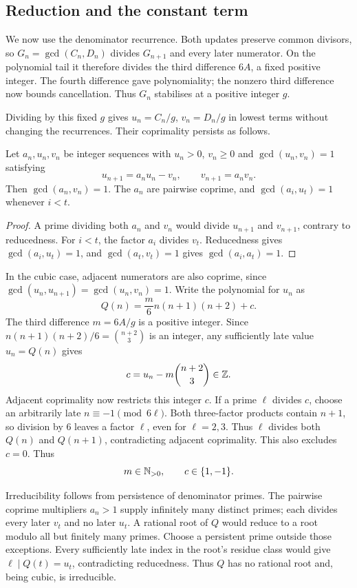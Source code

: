 \documentclass[11pt]{article}
\begin{document}
\subsection{Reduction and the constant term}\label{sec:cubic-normalisation}\label{sec:reduction}
We now use the denominator recurrence. Both updates preserve common
divisors, so $G_n=\gcd(C_n,D_n)$ divides $G_{n+1}$ and every later
numerator. On the polynomial tail it therefore divides the third
difference $6A$, a fixed positive integer. The fourth difference gave
polynomiality; the nonzero third difference now bounds cancellation.
Thus $G_n$ stabilises at a positive integer $g$.

Dividing by this fixed $g$ gives $u_n=C_n/g$, $v_n=D_n/g$ in lowest
terms without changing the recurrences. Their coprimality persists as
follows.

\begin{proposition}\label{res:reduced}
Let $a_n,u_n,v_n$ be integer sequences with $u_n>0$, $v_n\ge0$ and
$\gcd(u_n,v_n)=1$ satisfying
\[
 u_{n+1}=a_nu_n-v_n,\qquad v_{n+1}=a_nv_n.
\]
Then $\gcd(a_n,v_n)=1$. The $a_n$ are pairwise coprime, and
$\gcd(a_i,u_t)=1$ whenever $i<t$.
\end{proposition}
\begin{proof}
A prime dividing both $a_n$ and $v_n$ would divide $u_{n+1}$ and
$v_{n+1}$, contrary to reducedness. For $i<t$, the factor $a_i$ divides
$v_t$. Reducedness gives $\gcd(a_i,u_t)=1$, and
$\gcd(a_t,v_t)=1$ gives $\gcd(a_i,a_t)=1$.
\end{proof}

In the cubic case, adjacent numerators are also coprime, since
$\gcd(u_n,u_{n+1})=\gcd(u_n,v_n)=1$.
Write the polynomial for $u_n$ as
\begin{equation}\label{eq:normal-cubic}
 Q(n)=\frac m6 n(n+1)(n+2)+c.
\end{equation}
The third difference $m=6A/g$ is a positive integer. Since
$n(n+1)(n+2)/6=\binom{n+2}{3}$ is an integer, any sufficiently late
value $u_n=Q(n)$ gives
\[
 c=u_n-m\binom{n+2}{3}\in\mathbb{Z}.
\]
Adjacent coprimality now restricts this integer $c$.
If a prime $\ell$ divides $c$, choose an arbitrarily late
$n\equiv-1\pmod{6\ell}$. Both three-factor products contain $n+1$,
so division by $6$ leaves a factor $\ell$, even for $\ell=2,3$.
Thus $\ell$ divides both $Q(n)$ and $Q(n+1)$, contradicting adjacent
coprimality. This also excludes $c=0$.
Thus
\[
 m\in\mathbb{N}_{>0},\qquad c\in\{1,-1\}.
\]

Irreducibility follows from persistence of denominator primes.
The pairwise coprime multipliers $a_n>1$ supply infinitely many distinct
primes; each divides every later $v_t$ and no later $u_t$.
A rational root of $Q$ would reduce to a root modulo all but finitely
many primes. Choose a persistent prime outside those exceptions.
Every sufficiently late index in the root's residue class would give
$\ell\mid Q(t)=u_t$, contradicting reducedness. Thus $Q$ has no rational
root and, being cubic, is irreducible.
\end{document}

